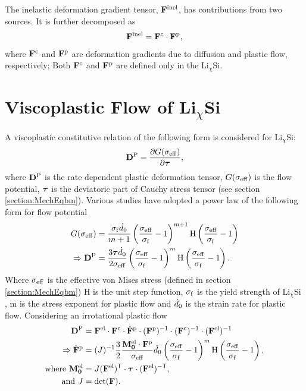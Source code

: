 The inelastic deformation gradient tensor, $\mathbf{F}^{{\rm{inel}}}$, has contributions from two sources. It is further decomposed as 
\begin{gather}
    \mathbf{F}^{\rm{inel}} = \mathbf{F}^{\rm{c}} \cdot \mathbf{F}^{\rm{p}}, \label{eq:Finel_decomposition}
\end{gather}where $\mathbf{F}^{\rm{c}}$ and $\mathbf{F}^{\rm{p}}$ are deformation gradients due to diffusion and plastic flow, respectively; Both $\mathbf{F}^{\rm{c}}$ and $\mathbf{F}^{\rm{p}}$ are defined only in the Li$_\chi$Si.

\section{Viscoplastic Flow of Li$_\chi$Si}
A viscoplastic constitutive relation of the following form is considered for Li$_\chi$Si:
\begin{gather}
\mathbf{D}^{\rm{P}} = \frac{\partial G(\sigma_{\rm{eff}})}{\partial \bm{\tau}},
\end{gather}
where $\mathbf{D}^{\rm{P}}$ is the rate dependent plastic deformation tensor, $G(\sigma_{\rm{eff}})$ is the flow potential, $\bm{\tau}$ is the deviatoric part of Cauchy stress tensor (see section \ref{section:MechEqbm}).
Various studies \citep{2011JMPSBower,2012JMPSCui} have adopted a power law of the following form for flow potential
\begin{align}
G(\sigma_{\rm{eff}}) &= \frac{\sigma_{\rm{f}} {\dot{d}}_0}{m+1}\left(\frac{\sigma_{\rm{eff}}}{\sigma_{\rm{f}}}-1\right)^{m+1}\mathrm{H}\left( \frac{\sigma_{\rm{eff}}}{\sigma_{\rm{f}}} - 1\right) \\
\Rightarrow \mathbf{D}^{\rm{P}} &= \frac{3 \bm{\tau} {\dot{d}}_0}{2 \sigma_{\rm{eff}}}\left(\frac{\sigma_{\rm{eff}}}{\sigma_{\rm{f}}}-1\right)^{m}\mathrm{H}\left( \frac{\sigma_{\rm{eff}}}{\sigma_{\rm{f}}} - 1\right).
\end{align}
Where $\sigma_{\rm{eff}}$ is the effective von Mises stress (defined in section \ref{section:MechEqbm}) H is the unit step function, $\sigma_{\rm{f}}$ is the yield strength of Li$_\chi$Si , m is the stress exponent for plastic flow and ${\dot{d}}_0$ is the strain rate for plastic flow. Considering an irrotational plastic flow \citep{2005JMPSGurtin, 2005IJPGurtin,2023IJSSAmit} 
\begin{align}
\mathbf{D}^{\rm{P}} &= \mathbf{F}^{{\rm{el}}} \cdot \mathbf{F}^{\rm{c}} \cdot \dot{\mathbf{F}}^{\rm{p}} \cdot (\mathbf{F}^{\rm{p}})^{-1} \cdot (\mathbf{F}^{\rm{c}})^{-1} \cdot (\mathbf{F}^{{\rm{el}}})^{-1}  \\
\Rightarrow \dot{\mathbf{F}}^{\rm{p}} &= (J)^{-1} \frac{3}{2} \frac{\mathbf{{M}_0^{{\rm{el}}}} \cdot \mathbf{F}^{\rm{p}}}{\sigma_{\rm{eff}}} {\dot{d}}_0 \left( \frac{\sigma_{\rm{eff}}}{\sigma_{\rm{f}}} - 1 \right)^m \mathrm{H}\left( \frac{\sigma_{\rm{eff}}}{\sigma_{\rm{f}}} - 1\right), \\
\text{where }\mathbf{{M}_0^{{\rm{el}}}} &= J (\mathbf{F}^{\rm{el}})^{\sf {T}} \cdot \bm{\tau} \cdot (\mathbf{F}^{\rm{el}})^{-\sf {T}} \label{eq:M_tensor},  \\
\text{and } J &= \mathrm{det}(\mathbf{F}). 
\end{align}
